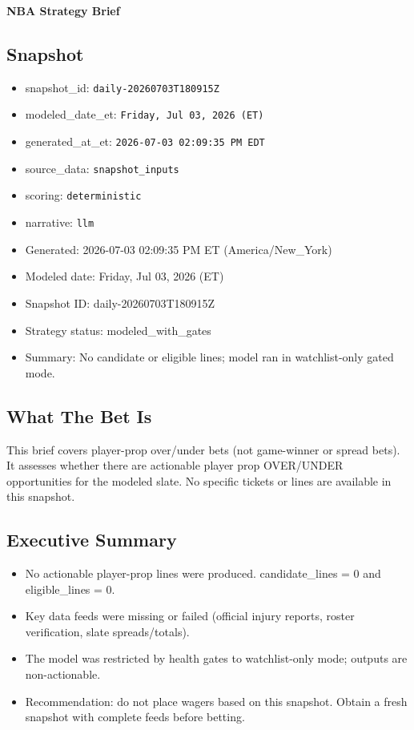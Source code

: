 \documentclass[10pt]{article}
\begin{document}
\begin{center}\LARGE\textbf{NBA Strategy Brief}\end{center}
\vspace{0.5em}
\subsection*{Snapshot}
\begin{itemize}
\item snapshot\_id: \texttt{daily-20260703T180915Z}
\item modeled\_date\_et: \texttt{Friday, Jul 03, 2026 (ET)}
\item generated\_at\_et: \texttt{2026-07-03 02:09:35 PM EDT}
\item source\_data: \texttt{snapshot\_inputs}
\item scoring: \texttt{deterministic}
\item narrative: \texttt{llm}
\item Generated: 2026-07-03 02:09:35 PM ET (America/New\_York)
\item Modeled date: Friday, Jul 03, 2026 (ET)
\item Snapshot ID: daily-20260703T180915Z
\item Strategy status: modeled\_with\_gates
\item Summary: No candidate or eligible lines; model ran in watchlist-only gated mode.
\end{itemize}

\subsection*{What The Bet Is}
This brief covers player-prop over/under bets (not game-winner or spread bets). It assesses whether there are actionable player prop OVER/UNDER opportunities for the modeled slate. No specific tickets or lines are available in this snapshot.

\subsection*{Executive Summary}
\begin{itemize}
\item No actionable player-prop lines were produced. candidate\_lines = 0 and eligible\_lines = 0.
\item Key data feeds were missing or failed (official injury reports, roster verification, slate spreads/totals).
\item The model was restricted by health gates to watchlist-only mode; outputs are non-actionable.
\item Recommendation: do not place wagers based on this snapshot. Obtain a fresh snapshot with complete feeds before betting.
\end{itemize}
\end{document}
